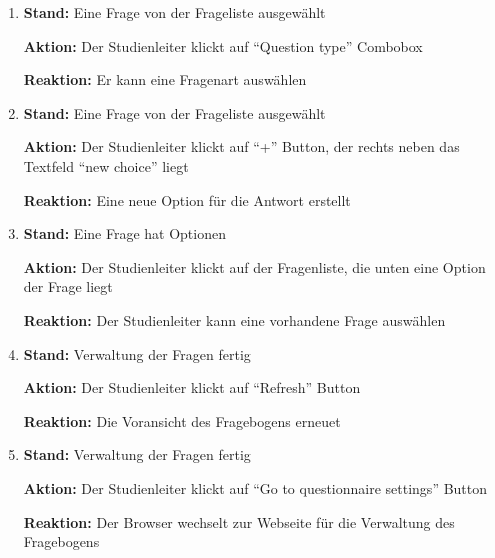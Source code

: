 \documentclass[a4paper]{scrreprt}
\begin{document}
\begin{itemize}
\begin{enumerate}
                        \item \par \textbf{Stand: } Eine Frage von der Frageliste ausgewählt
                              \par \textbf{Aktion: } Der \gls{Studienleiter} klickt auf ``Question type'' Combobox
                              \par \textbf{Reaktion: } Er kann eine Fragenart auswählen

                        \item \par \textbf{Stand: }  Eine Frage von der Frageliste ausgewählt
                              \par \textbf{Aktion: } Der \gls{Studienleiter} klickt auf ``+'' Button, der rechts neben das Textfeld ``new choice'' liegt
                              \par \textbf{Reaktion: } Eine neue Option für die Antwort erstellt

                        \item \par \textbf{Stand: } Eine Frage hat Optionen
                              \par \textbf{Aktion: } Der \gls{Studienleiter} klickt auf der Fragenliste, die unten eine Option der Frage liegt
                              \par \textbf{Reaktion: }Der \gls{Studienleiter} kann eine vorhandene Frage auswählen

                        \item \par \textbf{Stand: }  Verwaltung der Fragen fertig
                              \par \textbf{Aktion: } Der \gls{Studienleiter} klickt auf ``Refresh'' Button
                              \par \textbf{Reaktion: } Die Voransicht des Fragebogens erneuet

                        \item \par \textbf{Stand: } Verwaltung der Fragen fertig
                              \par \textbf{Aktion: } Der \gls{Studienleiter} klickt auf ``Go to questionnaire settings'' Button
                              \par \textbf{Reaktion: } Der Browser wechselt zur Webseite für die Verwaltung des Fragebogens

                    \end{enumerate}



\end{itemize}
\end{document}
